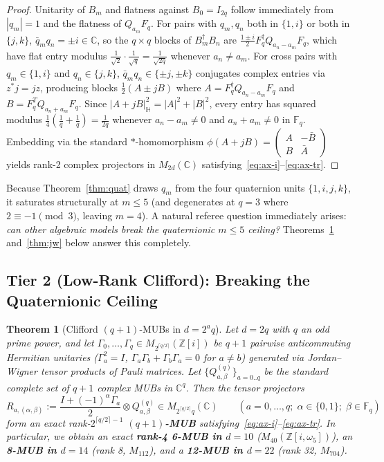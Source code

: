 \documentclass[11pt,a4paper]{article}
\newtheorem{theorem}{Theorem}[section]
\theoremstyle{definition}
\newcommand{\C}{\mathbb{C}}
\newcommand{\Z}{\mathbb{Z}}
\newcommand{\HH}{\mathbb{H}}
\newcommand{\F}{\mathbb{F}}
\begin{document}
\begin{proof}
Unitarity of $B_m$ and flatness against $B_0 = I_{2q}$ follow immediately from $|q_m| = 1$ and the flatness of $Q_{a_m} F_q$. For pairs with $q_m, q_n$ both in $\{1,i\}$ or both in $\{j,k\}$, $\bar{q}_m q_n = \pm i \in \C$, so the $q\times q$ blocks of $B_m^\dagger B_n$ are $\frac{1 \pm i}{2} F_q^\dagger Q_{a_n - a_m} F_q$, which have flat entry modulus $\frac{1}{\sqrt{2}} \cdot \frac{1}{\sqrt{q}} = \frac{1}{\sqrt{2q}}$ whenever $a_n \ne a_m$. For cross pairs with $q_m \in \{1,i\}$ and $q_n \in \{j,k\}$, $\bar{q}_m q_n \in \{\pm j, \pm k\}$ conjugates complex entries via $z^* j = j z$, producing blocks $\frac{1}{2}(A \pm j B)$ where $A = F_q^\dagger Q_{a_n - a_m} F_q$ and $B = F_q^T Q_{a_n + a_m} F_q$. Since $|A + jB|_{\HH}^2 = |A|^2 + |B|^2$, every entry has squared modulus $\frac{1}{4}(\frac{1}{q} + \frac{1}{q}) = \frac{1}{2q}$ whenever $a_n - a_m \ne 0$ and $a_n + a_m \ne 0$ in $\F_q$. Embedding via the standard $*$-homomorphism $\phi(A + jB) = \begin{pmatrix} A & -\bar{B} \\ B & \bar{A} \end{pmatrix}$ yields rank-2 complex projectors in $M_{2d}(\C)$ satisfying~\eqref{eq:ax-i}--\eqref{eq:ax-tr}.
\end{proof}

Because Theorem~\ref{thm:quat} draws $q_m$ from the four quaternion units $\{1, i, j, k\}$, it saturates structurally at $m \le 5$ (and degenerates at $q = 3$ where $2 \equiv -1 \pmod 3$, leaving $m = 4$). A natural referee question immediately arises: \emph{can other algebraic models break the quaternionic $m \le 5$ ceiling?} Theorems~\ref{thm:clifford} and~\ref{thm:jw} below answer this completely.

\subsection{Tier 2 (Low-Rank Clifford): Breaking the Quaternionic Ceiling}

\begin{theorem}[Clifford $(q+1)$-MUBs in $d = 2^a q$]
\label{thm:clifford}
Let $d = 2q$ with $q$ an odd prime power, and let $\Gamma_0, \dots, \Gamma_q \in M_{2^{\lceil q/2 \rceil}}(\Z[i])$ be $q+1$ pairwise anticommuting Hermitian unitaries ($\Gamma_a^2 = I$, $\Gamma_a \Gamma_b + \Gamma_b \Gamma_a = 0$ for $a \ne b$) generated via Jordan--Wigner tensor products of Pauli matrices. Let $\{Q^{(q)}_{a,\beta}\}_{a=0..q}$ be the standard complete set of $q+1$ complex MUBs in $\C^q$. Then the tensor projectors
\[
  R_{a, (\alpha, \beta)} := \frac{I + (-1)^\alpha \Gamma_a}{2} \otimes Q^{(q)}_{a,\beta} \in M_{2^{\lceil q/2 \rceil} q}(\C) \qquad (a = 0,\dots,q;\; \alpha \in \{0,1\};\; \beta \in \F_q)
\]
form an exact rank-$2^{\lceil q/2 \rceil - 1}$ \textbf{$(q+1)$-MUB} satisfying~\eqref{eq:ax-i}--\eqref{eq:ax-tr}. In particular, we obtain an exact \textbf{rank-4 6-MUB in $d = 10$} ($M_{40}(\Z[i,\omega_5])$), an \textbf{8-MUB in $d = 14$} (rank 8, $M_{112}$), and a \textbf{12-MUB in $d = 22$} (rank 32, $M_{704}$).
\end{theorem}
\end{document}

